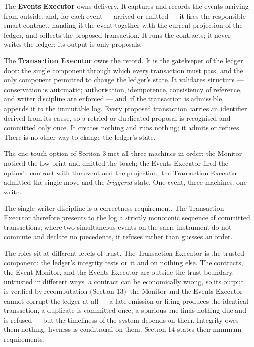 \documentclass[11pt,a4paper]{article}
\begin{document}
The \textbf{Events Executor} owns delivery. It captures and records the
events arriving from outside, and, for each event --- arrived or emitted
--- it fires the responsible smart contract, handing it the event
together with the current projection of the ledger, and collects the
proposed transaction. It runs the contracts; it never writes the ledger;
its output is only proposals.

The \textbf{Transaction Executor} owns the record. It is the gatekeeper
of the ledger door: the single component through which every transaction
must pass, and the only component permitted to change the ledger's
state. It validates structure --- conservation is automatic;
authorisation, idempotence, consistency of reference, and writer
discipline are enforced --- and, if the transaction is admissible,
appends it to the immutable log. Every proposed transaction carries an
identifier derived from its cause, so a retried or duplicated proposal
is recognised and committed only once. It creates nothing and runs
nothing; it admits or refuses. There is no other way to change the
ledger's state.

The one-touch option of Section 3 met all three machines in order: the
Monitor noticed the low print and emitted the touch; the Events Executor
fired the option's contract with the event and the projection; the
Transaction Executor admitted the single move and the \emph{triggered}
state. One event, three machines, one write.

The single-writer discipline is a correctness requirement. The
Transaction Executor therefore presents to the log a strictly monotonic
sequence of committed transactions; where two simultaneous events on the
same instrument do not commute and declare no precedence, it refuses
rather than guesses an order.

The roles sit at different levels of trust. The Transaction Executor is
the trusted component: the ledger's integrity rests on it and on nothing
else. The contracts, the Event Monitor, and the Events Executor are
outside the trust boundary, untrusted in different ways: a contract can
be economically wrong, so its output is verified by recomputation
(Section 13); the Monitor and the Events Executor cannot corrupt the
ledger at all --- a late emission or firing produces the identical
transaction, a duplicate is committed once, a spurious one finds nothing
due and is refused --- but the timeliness of the system depends on them.
Integrity owes them nothing; liveness is conditional on them. Section 14
states their minimum requirements.
\end{document}
